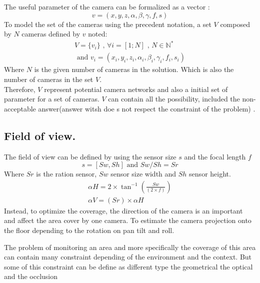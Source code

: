The useful parameter of the camera can be formalized as a vector :
\begin{equation}\label{eq:v}
v=(x,y,z,\alpha ,\beta,\gamma,f,s)
\end{equation}
To model the set of the cameras using the precedent notation, a set $V$ composed by $N$ cameras defined by $v$ noted:
\begin{equation}\label{eq:V}
\begin{split}
V= \{v_i\} \mbox{  , } \forall i=[1;N] \mbox{ , } N\in \mathbb{N}^*
\\
\mbox{ and } v_i= (x_i,y_i,z_i,\alpha_i ,\beta_i,\gamma_i,f_i,s_i)
\end{split}
\end{equation}
\noindent Where $N$ is the given number of cameras in the solution. Which is also the number of cameras in the set $V$. \\
Therefore, $V$ represent potential camera networks and also a initial set of parameter for a set of cameras. $V$ can contain all the possibility, included the non-acceptable answer(answer witsh  doe s not respect the constraint of the problem) .

\subsection{Field of view.}

The field of view can be defined by using the sensor size $s$ and the focal length $f$
\begin{equation}\label{eq:sSwSh}
s=[Sw,Sh]  \mbox{ and } Sw/Sh=Sr
\end{equation}
Where $Sr$ is the ration sensor, $Sw$ sensor size width and $Sh$ sensor height.
\begin{equation}\label{eq:sSwSh}
 \begin{split}
	\alpha H = 2\times \tan^{-1} (\frac{Sw}{(2\times f)}  ) 
    \\
	\alpha V = (Sr )\times \alpha H
  \end{split}
\end{equation}
Instead, to optimize the coverage, the direction of the camera is an important and affect the area cover by one camera. To estimate the camera projection onto the floor depending to the rotation on pan tilt and roll.

The problem of monitoring an area and more specifically the coverage of this area can contain many constraint depending of the environment and the context. But some of this constraint can be define as different type the geometrical the optical and the occlusion

